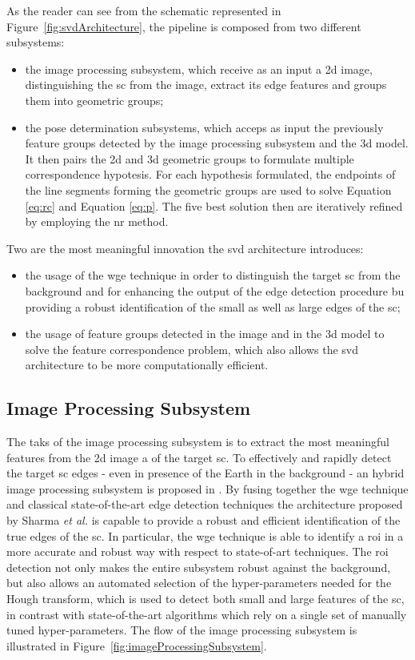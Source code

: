 As the reader can see from the schematic represented in Figure~\ref{fig:svdArchitecture}, the pipeline is composed from two different subsystems:
\begin{itemize}
  \item the image processing subsystem, which receive as an input a \acrshort{2d} image, distinguishing the \acrshort{sc} from the image, extract its edge features and groups them into geometric groups;
  \item the pose determination subsystems, which acceps as input the previously feature groups detected by the image processing subsystem and the \acrshort{3d} model. It then pairs the \acrshort{2d} and \acrshort{3d} geometric groups to formulate multiple correspondence hypotesis. For each hypothesis formulated, the endpoints of the line segments forming the geometric groups are used to solve Equation \eqref{eq:rc} and Equation \eqref{eq:p}. The five best solution then are iteratively refined by employing the \acrshort{nr} method.
\end{itemize}

Two are the most meaningful innovation the \acrshort{svd} architecture introduces:
\begin{itemize}
  \item the usage of the \acrshort{wge} technique in order to distinguish the target \acrshort{sc} from the background and for enhancing the output of the edge detection procedure bu providing a robust identification of the small as well as large edges of the \acrshort{sc};
  \item the usage of feature groups detected in the image and in the \acrshort{3d} model to solve the feature correspondence problem, which also allows the \acrshort{svd} architecture to be more computationally efficient.
\end{itemize}

\subsection{Image Processing Subsystem}
The taks of the image processing subsystem is to extract the most meaningful features from the \acrshort{2d} image a of the target \acrshort{sc}. To effectively and rapidly detect the target \acrshort{sc} edges - even in presence of the Earth in the background - an hybrid image processing subsystem is proposed in \cite{Sharma2018}.
By fusing together the \acrshort{wge} technique and classical state-of-the-art edge detection techniques the architecture proposed by Sharma \textit{et al.} is capable to provide a robust and efficient identification of the true edges of the \acrshort{sc}.
In particular, the \acrshort{wge} technique is able to identify a \acrfull{roi} in a more accurate and robust way with respect to state-of-art techniques. The \acrshort{roi} detection not only makes the entire subsystem robust against the background, but also allows an automated selection of the hyper-parameters needed for the Hough transform, which is used to detect both small and large features of the \acrshort{sc}, in contrast with state-of-the-art algorithms which rely on a single set of manually tuned hyper-parameters.
The flow of the image processing subsystem is illustrated in Figure~\ref{fig:imageProcessingSubsystem}.

